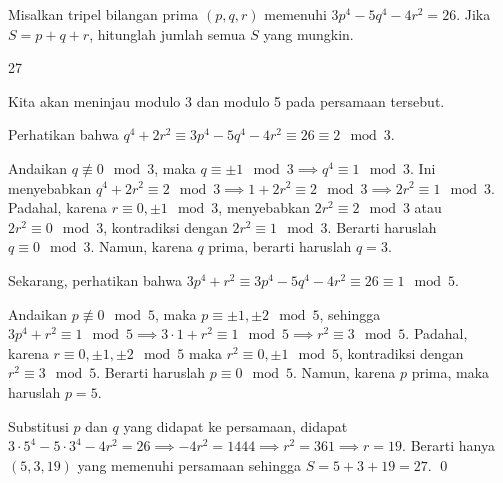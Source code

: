 \documentclass[11pt]{scrartcl}
\begin{document}
	\begin{soalbaru}
		Misalkan tripel bilangan prima $(p,q,r)$ memenuhi $3p^4-5q^4-4r^2=26$. Jika $S = p+q+r$, hitunglah jumlah semua $S$ yang mungkin.
		
		\begin{jawaban}
		27
		\end{jawaban}
		\begin{solusi}
		Kita akan meninjau modulo 3 dan modulo 5 pada persamaan tersebut. 
		
		Perhatikan bahwa $q^4+2r^2 \equiv 3p^4-5q^4-4r^2 \equiv 26 \equiv 2\mod 3$. 
		
		Andaikan $q \not\equiv 0 \mod 3$, maka $q \equiv \pm 1 \mod 3 \implies q^4 \equiv 1 \mod 3$. Ini  menyebabkan $q^4 +2r^2 \equiv 2 \mod 3 \implies 1 + 2r^2 \equiv 2 \mod 3 \implies 2r^2 \equiv 1 \mod 3$. Padahal, karena $r \equiv 0,\pm 1 \mod 3$, menyebabkan $2r^2 \equiv  2 \mod 3$ atau $2r^2 \equiv 0 \mod 3$, kontradiksi dengan $2r^2 \equiv 1 \mod 3$. Berarti haruslah $q \equiv 0 \mod 3$. Namun, karena $q$ prima, berarti haruslah $q=3$.
		
		Sekarang, perhatikan bahwa $3p^4+r^2 \equiv 3p^4-5q^4-4r^2 \equiv 26 \equiv 1 \mod 5$.
		
		Andaikan $p \not \equiv 0 \mod 5$, maka $p \equiv \pm1,\pm2 \mod 5$, sehingga $3p^4+r^2 \equiv 1 \mod 5 \implies 3\cdot1+r^2 \equiv 1 \mod 5 \implies r^2 \equiv 3 \mod 5$. Padahal, karena $r \equiv 0,\pm1,\pm2 \mod 5$ maka $r^2 \equiv 0,\pm1 \mod 5$, kontradiksi dengan $r^2 \equiv 3 \mod 5$. Berarti haruslah $p \equiv 0 \mod 5$. Namun, karena $p$ prima, maka haruslah $p=5$.
		
		Substitusi $p$ dan $q$ yang didapat ke persamaan, didapat $3\cdot 5^4 - 5 \cdot 3^4 - 4r^2 = 26 \implies -4r^2 = 1444 \implies r^2 = 361 \implies r = 19$. Berarti hanya $(5,3,19)$ yang memenuhi persamaan sehingga $S=5+3+19=27$. \qed
		\end{solusi}
	\end{soalbaru}
	
\end{document}
